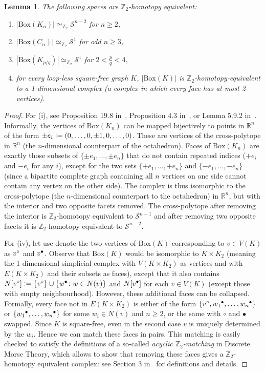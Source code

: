 \documentclass[11pt,a4paper]{scrartcl}
\numberwithin{theorem}{section}
\newtheorem{lemma}[theorem]{Lemma}
\theoremstyle{definition}
\newcommand{\ZZ}{\mathbb{Z}}
\newcommand{\RR}{\mathbb{R}}
\newcommand{\defeq}{\vcentcolon=}
\newcommand\Sphere{\mathcal{S}}
\newcommand\Bx[1]{\mathrm{Box}(#1)}
\newcommand\BBox[1]{\left|\mathrm{Box}(#1)\right|}
\newcommand{\zeq}{\simeq_{\ZZ_2}}
\newcommand{\vL}[1]{{#1}{}\sp{\circ}}
\newcommand{\vR}[1]{{#1}{}\sp{\bullet}}
\begin{document}
\begin{lemma}\label{lem:boxes}
	The following spaces are $\ZZ_2$-homotopy equivalent:
	\begin{enumerate}[label=(\roman*),itemsep=0pt]
	\item $\BBox{K_n} \zeq \Sphere^{n-2}$ for $n\geq 2$,
	\item $\BBox{C_n} \simeq_{\ZZ_2} \Sphere^1$ for odd $n\geq 3$,
	\item $\BBox{K_{p/q}} \simeq_{\ZZ_2} \Sphere^1$ for $2<\frac{p}{q}<4$,
	\item for every loop-less square-free graph $K$, $\BBox{K}$ is $\ZZ_2$-homotopy-equivalent to a 1-dimensional complex (a complex in which every face has at most 2 vertices).
	\end{enumerate}
\end{lemma}
\begin{proof}
	For (i), see Proposition 19.8 in~\cite{Kozlov2008book}, Proposition 4.3 in~\cite{babson2006}, or Lemma 5.9.2 in~\cite{matousek2008using}.
	Informally, the vertices of $\Bx{K_n}$ can be mapped bijectively to points in $\RR^n$ of the form $\pm e_i \defeq (0,\dots,0,\pm1,0,\dots,0)$.
	These are vertices of the cross-polytope in $\RR^n$ (the $n$-dimensional counterpart of the octahedron).
	Faces of $\Bx{K_n}$ are exactly those subsets of $\{\pm e_1,\dots,\pm e_n\}$ that do not contain repeated indices ($+e_i$ and $-e_i$ for any $i$), except for the two sets $\{+e_1,\dots,+e_n\}$ and $\{-e_1,\dots,-e_n\}$ (since a bipartite complete graph containing all $n$ vertices on one side cannot contain any vertex on the other side).
	The complex is thus isomorphic to the cross-polytope (the $n$-dimensional counterpart to the octahedron) in $\RR^n$, but with the interior and two opposite facets removed.
	The cross-polytope after removing the interior is $\ZZ_2$-homotopy equivalent to $\Sphere^{n-1}$ and after removing two opposite facets it is $\ZZ_2$-homotopy equivalent to $\Sphere^{n-2}$.
	
	For (iv), let use denote the two vertices of $\Bx{K}$ corresponding to $v \in V(K)$ as $\vL{v}$ and $\vR{v}$.
	Observe that $\Bx{K}$ would be isomorphic to $K \times K_2$ (meaning the 1-dimensional simplicial complex with $V(K \times K_2)$ as vertices and with $E(K \times K_2)$ and their subsets as faces), except that it also contains $N[\vL{v}] \defeq \{\vL{v}\} \cup \{\vR{w} \colon w \in N(v)\}$ and $N[\vR{v}]$ for each $v \in V(K)$ (except those with empty neighbourhood).
	However, these additional faces can be collapsed.
	Formally, every face not in $E(K \times K_2)$ is either of the form $\{\vL{v},\vR{w_1},\dots,\vR{w_n}\}$ or $\{\vR{w_1},\dots,\vR{w_n}\}$ for some $w_i \in N(v)$ and $n\geq 2$,
	or the same with $\circ$ and $\bullet$ swapped.
	Since $K$ is square-free, even in the second case $v$ is uniquely determined by the $w_i$.
	Hence we can match these faces in pairs.
	This matching is easily checked to satisfy the definitions of a so-called \emph{acyclic $\ZZ_2$-matching} in Discrete Morse Theory,
	which allows to show that removing these faces gives a $\ZZ_2$-homotopy equivalent complex:
	see Section 3 in~\cite{Wrochna17b} for definitions and details.
	

\end{proof}
\end{document}
